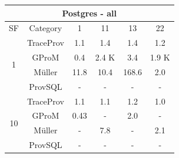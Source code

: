 \begin{tabular}{|c|c|c|c|c|c|}
\hline
\multicolumn{6}{c}{Postgres - all} \\
\hline
SF & Category & 1 & 11 & 13 & 22 \\  
 \hline 
 \multirow{4}{*}{1} & TraceProv & 1.1 & 1.4 & 1.4 & 1.2 \\  
 \cline{2-6} 
  & GProM & 0.4 & 2.4 K & 3.4 & 1.9 K \\  
 \cline{2-6} 
  & Müller & 11.8 & 10.4 & 168.6 & 2.0 \\  
 \cline{2-6} 
  & ProvSQL & - & - & - & - \\  
 \hline 
 \multirow{4}{*}{10} & TraceProv & 1.1 & 1.1 & 1.2 & 1.0 \\  
 \cline{2-6} 
  & GProM & 0.43 & - & 2.0 & - \\  
 \cline{2-6} 
  & Müller & - & 7.8 & - & 2.1 \\  
 \cline{2-6} 
  & ProvSQL & - & - & - & - \\ 
\hline
\end{tabular}